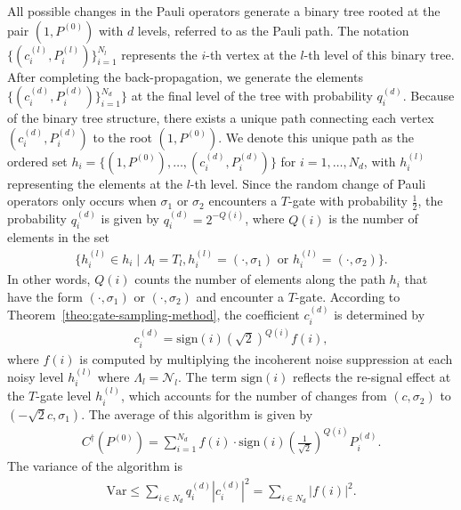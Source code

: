 \documentclass[aps,%
twocolumn,%
floatfix,%
pra,%
amsfonts,%
longbibliography,%
groupedaddress,%
superscriptaddress]{revtex4-2}%
\newcommand{\1}{\mathbbm{1}}
\begin{document}
All possible changes in the Pauli operators generate a binary tree rooted at the pair \( (1, P^{(0)}) \) with \( d \) levels, referred to as the Pauli path. 
The notation \( \{ (c_i^{(l)}, P_i^{(l)}) \}_{i=1}^{N_l} \) represents the \( i \)-th vertex at the \( l \)-th level of this binary tree. 
After completing the back-propagation, we generate the elements \( \{ (c_i^{(d)}, P_i^{(d)}) \}_{i=1}^{N_d} \} \) at the final level of the tree with probability \( q_i^{(d)} \). 
Because of the binary tree structure, there exists a unique path connecting each vertex \( (c_i^{(d)}, P_i^{(d)}) \) to the root \( (1, P^{(0)}) \). 
We denote this unique path as the ordered set \( h_i = \{ (1, P^{(0)}), \dots, (c_i^{(d)}, P_i^{(d)}) \} \) for \( i = 1, \dots, N_d \), with \( h_i^{(l)} \) representing the elements at the \( l \)-th level.
Since the random change of Pauli operators only occurs when \( \sigma_1 \) or \( \sigma_2 \) encounters a \( T \)-gate with probability \( \frac{1}{2} \), the probability \( q_i^{(d)} \) is given by $q_i^{(d)} = 2^{-Q(i)}$, where \( Q(i) \) is the number of elements in the set
\begin{align}
    \{ h_i^{(l)} \in h_i \mid \Lambda_l = T_l, h_i^{(l)} = (\cdot, \sigma_1) \text{ or } h_i^{(l)} = (\cdot, \sigma_2) \}.
\end{align}
In other words, \( Q(i) \) counts the number of elements along the path \( h_i \) that have the form \( (\cdot, \sigma_1) \) or \( (\cdot, \sigma_2) \) and encounter a \( T \)-gate.
According to Theorem~\ref{theo:gate-sampling-method}, the coefficient \( c_i^{(d)} \) is determined by
\begin{align}
    c_i^{(d)} = \text{sign}(i) (\sqrt{2})^{Q(i)} f(i),
\end{align}
where \( f(i) \) is computed by multiplying the incoherent noise suppression at each noisy level \( h_i^{(l)} \) where \( \Lambda_l = \mathcal{N}_l \).
The term \( \text{sign}(i) \) reflects the re-signal effect at the \( T \)-gate level \( h_i^{(l)} \), which accounts for the number of changes from \( (c, \sigma_2) \) to \( (-\sqrt{2}c, \sigma_1) \).
The average of this algorithm is given by
\begin{align}
    C^\dagger(P^{(0)}) = \sum_{i=1}^{N_d} f(i) \cdot \text{sign}(i) \left( \frac{1}{\sqrt{2}} \right)^{Q(i)} P_i^{(d)}.
\end{align}
The variance of the algorithm is
\begin{align}
    \text{Var} \leq \sum_{i \in N_d} q_i^{(d)} |c_i^{(d)}|^2 = \sum_{i \in N_d} |f(i)|^2.
\end{align}
\end{document}

